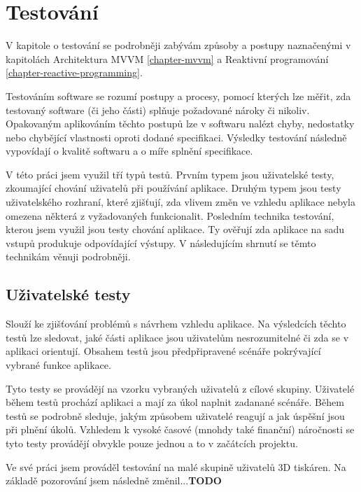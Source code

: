 \chapter{Testování}

V kapitole o testování se podrobněji zabývám způsoby a postupy naznačenými v kapitolách Architektura MVVM \ref{chapter-mvvm} a Reaktivní programování \ref{chapter-reactive-programming}.

Testováním software se rozumí postupy a procesy, pomocí kterých lze měřit, zda testovaný software (či jeho části) splňuje požadované nároky či nikoliv.
Opakovaným aplikováním těchto postupů lze v softwaru nalézt chyby, nedostatky nebo chybějící vlastnosti oproti dodané specifikaci.
Výsledky testování následně vypovídají o kvalitě softwaru a o míře splnění specifikace. \cite{software-testing-definition}

V této práci jsem využil tří typů testů.
Prvním typem jsou uživatelské testy, zkoumající chování uživatelů při používání aplikace.
Druhým typem jsou testy uživatelského rozhraní, které zjišťují, zda vlivem změn ve vzhledu aplikace nebyla omezena některá z vyžadovaných funkcionalit.
Posledním technika testování, kterou jsem využil jsou testy chování aplikace.
Ty ověřují zda aplikace na sadu vstupů produkuje odpovídající výstupy.
V následujícím shrnutí se těmto technikám věnuji podrobněji.

\section{Uživatelské testy}

Slouží ke zjišťování problémů s návrhem vzhledu aplikace.
Na výsledcích těchto testů lze sledovat, jaké části aplikace jsou uživatelům nesrozumitelné či zda se v aplikaci orientují.
Obsahem testů jsou předpřipravené scénáře pokrývající vybrané funkce aplikace.\cite{dobry-web-ux-testing}

Tyto testy se provádějí na vzorku vybraných uživatelů z cílové skupiny.
Uživatelé během testů prochází aplikaci a mají za úkol naplnit zadanané scénáře.
Během testů se podrobně sleduje, jakým způsobem uživatelé reagují a jak úspěšní jsou při plnění úkolů.
Vzhledem k vysoké časové (mnohdy také finanční) náročnosti se tyto testy provádějí obvykle pouze jednou a to v začátcích projektu. \cite{h1-ux-testing}

Ve své práci jsem prováděl testování na malé skupině uživatelů 3D tiskáren.
Na základě pozorování jsem následně změnil...\textbf{TODO}

